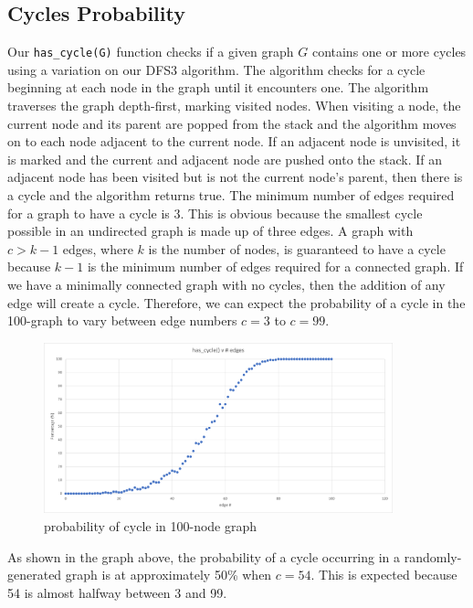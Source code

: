 \documentclass[12pt]{article}
\begin{document}
\subsection{Cycles Probability}
Our \verb+has_cycle(G)+ function checks if a given graph $G$ contains one or more cycles using a variation on our DFS3 algorithm. The algorithm checks for a cycle beginning at each node in the graph until it encounters one. The algorithm traverses the graph depth-first, marking visited nodes. When visiting a node, the current node and its parent are popped from the stack and the algorithm moves on to each node adjacent to the current node. If an adjacent node is unvisited, it is marked and the current and adjacent node are pushed onto the stack. If an adjacent node has been visited but is not the current node's parent, then there is a cycle and the algorithm returns true.
The minimum number of edges required for a graph to have a cycle is $3$. This is obvious because the smallest cycle possible in an undirected graph is made up of three edges. A graph with $c > k-1$ edges, where $k$ is the number of nodes, is guaranteed to have a cycle because $k-1$ is the minimum number of edges required for a connected graph. If we have a minimally connected graph with no cycles, then the addition of any edge will create a cycle. Therefore, we can expect the probability of a cycle in the 100-graph to vary between edge numbers $c=3$ to $c=99$.
\begin{figure}[H]
\centering
\includegraphics[width=0.9\textwidth,height=\textheight,keepaspectratio]{cycle}
\caption{probability of cycle in 100-node graph}
\label{Figure: m1}
\end{figure}
\noindent As shown in the graph above, the probability of a cycle occurring in a randomly-generated graph is at approximately 50\% when $c=54$. This is expected because 54 is almost halfway between 3 and 99. 
\end{document}
